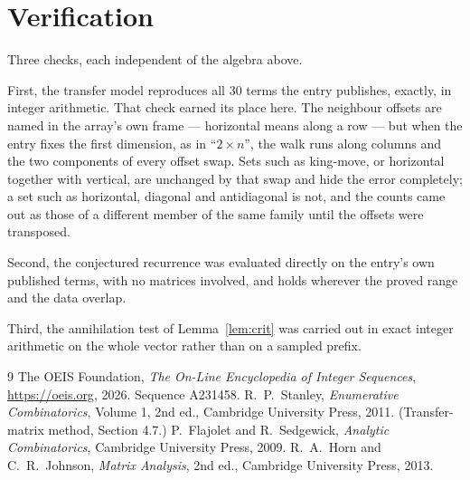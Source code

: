\documentclass[11pt,a4paper]{article}
\theoremstyle{plain}
\theoremstyle{definition}
\begin{document}
\section{Verification}

Three checks, each independent of the algebra above.

First, the transfer model reproduces all $30$ terms the entry publishes, exactly, in
integer arithmetic. That check earned its place here. The neighbour offsets are named in the
array's own frame --- horizontal means along a row --- but when the entry fixes the first
dimension, as in ``$2\times n$'', the walk runs along columns and the two components of every
offset swap. Sets such as king-move, or horizontal together with vertical, are unchanged by
that swap and hide the error completely; a set such as horizontal, diagonal and antidiagonal
is not, and the counts came out as those of a different member of the same family until the
offsets were transposed.

Second, the conjectured recurrence was evaluated directly on the entry's own published terms,
with no matrices involved, and holds wherever the proved range and the data overlap.

Third, the annihilation test of Lemma~\ref{lem:crit} was carried out in exact integer
arithmetic on the whole vector rather than on a sampled prefix.

\begin{thebibliography}{9}
 The OEIS Foundation, \emph{The On-Line Encyclopedia of Integer
Sequences}, \url{https://oeis.org}, 2026. Sequence A231458.
 R.~P.~Stanley, \emph{Enumerative Combinatorics}, Volume 1, 2nd ed.,
Cambridge University Press, 2011. (Transfer-matrix method, Section 4.7.)
 P.~Flajolet and R.~Sedgewick, \emph{Analytic Combinatorics}, Cambridge
University Press, 2009.
 R.~A.~Horn and C.~R.~Johnson, \emph{Matrix Analysis}, 2nd ed., Cambridge
University Press, 2013.
\end{thebibliography}
\end{document}
